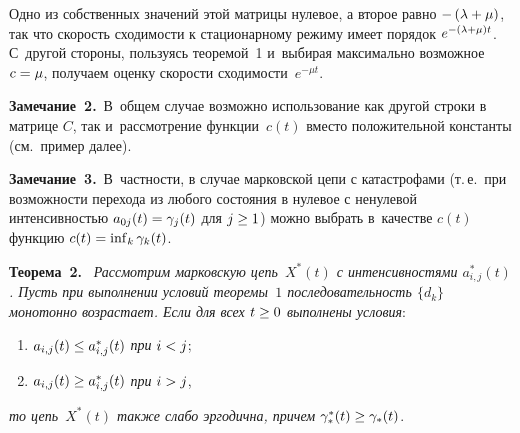 \begin{multicols}{2}
\noindent
Одно из собственных значений этой матрицы нулевое, а второе равно $-\left(\lambda \hm+ \mu\right)$, так что скорость сходимости к стационарному режиму 
имеет порядок $e^{-\left(\lambda\hm + \mu\right)t}$. С~другой стороны, пользуясь 
теоремой~1 и~выбирая максимально возможное $c\hm=\mu$, получаем оценку 
скорости сходимости~$e^{-\mu t}$.

\smallskip


\noindent
\textbf{Замечание~2.}\ В~общем случае возможно использование как другой строки в матрице 
$C$, так и~рас\-смот\-ре\-ние функции~$c(t)$ вместо положительной константы (см.\ 
пример далее).

\smallskip


\noindent
\textbf{Замечание~3.}\ В~частности, в случае марковской цепи с катастрофами (т.\,е.\ при 
возможности перехода из любого состояния в нулевое с ненулевой  интенсивностью $a_{0j}(t) \hm= \gamma_j(t) $ для $ j\hm \ge 1 $) 
можно выбрать в~качестве  $ c(t) $ функцию  $ c(t)\hm= \inf\nolimits_k \gamma_k(t) $.

\smallskip

\noindent
\textbf{Теорема~2.}\ %
\textit{Рассмотрим марковскую цепь~$X^*(t)$ с интенсивностями 
$a^*_{i,j}(t)$. Пусть при выполнении условий тео\-ре\-мы~$1$ последовательность 
$\{d_k\}$ монотонно возрастает.  Если для всех $t\hm \ge 0$ выполнены условия}:

\pagebreak

\noindent
\begin{enumerate}[(1)]
\item $a_{i,j}(t) \hm\le a^*_{i,j}(t)$ \textit{при} $i\hm<j$; 
\item $a_{i,j}(t) \hm\ge a^*_{i,j}(t)$ \textit{при} 
$i\hm>j$,
\end{enumerate}
 \textit{то цепь~$X^*(t)$ также слабо эргодична, причем $\gamma_{*}^*(t) \hm\ge  \gamma_{*}(t)$}.




\end{multicols}
